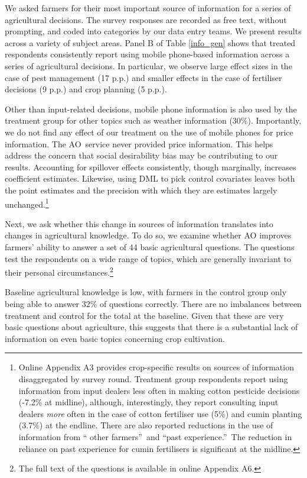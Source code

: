 \documentclass[12pt]{article}
\begin{document}
{\normalsize We asked farmers for their most important source of information
for a series of agricultural decisions. The survey responses are recorded as
free text, without prompting, and coded into categories by our data entry
teams. We present results across a variety of subject areas. Panel B of
Table \ref*{info_gen} shows that treated respondents 
consistently report using mobile phone-based information across a series of
agricultural decisions. In particular, we observe large effect sizes in
the case of pest management (17 p.p.) and smaller effects in the case of
fertiliser decisions (9 p.p.) and crop planning (5 p.p.). }

{\normalsize Other than input-related decisions, mobile phone information is
also used by the treatment group for other topics such as 
weather information (30\%). Importantly, we do not find any effect of our treatment
on the use of mobile phones for price information. The AO\ service never
provided price information. This helps address the concern that social
desirability bias may be contributing to our results. Accounting for spillover effects consistently, though marginally, increases coefficient estimates. Likewise, using  DML to pick control covariates leaves both the point estimates and the precision with which they are estimates largely unchanged.\footnote{Online Appendix A3 provides crop-specific results on sources of
information disaggregated by survey round. Treatment group respondents
report using information from input dealers less often in making cotton
pesticide decisions (-7.2\% at midline), although, interestingly, they
report consulting input dealers \textit{more} often in the case of cotton
fertiliser use (5\%) and cumin planting (3.7\%) at the endline. There are
also reported reductions in the use of information from \textquotedblleft
other farmers\textquotedblright\ and \textquotedblleft past
experience.\textquotedblright\ The reduction in reliance on past experience
for cumin fertilisers is significant at the midline.}}

{\normalsize Next, we ask whether this change in sources of information translates into changes in agricultural knowledge.  To do so, we examine whether AO improves farmers' ability to answer a set of 44 
basic agricultural questions. The questions test the respondents on a wide
range of topics, which are generally invariant to their personal
circumstances.\footnote{%
The full text of the questions is available in online Appendix A6.} }

{\normalsize Baseline agricultural knowledge is low, with farmers in the
control group only being able to answer 32\% of questions correctly. There
are no imbalances between treatment and control for the total at the
baseline. Given that these are very basic questions about agriculture, this
suggests that there is a substantial lack of information on even basic
topics concerning crop cultivation. }
\end{document}
